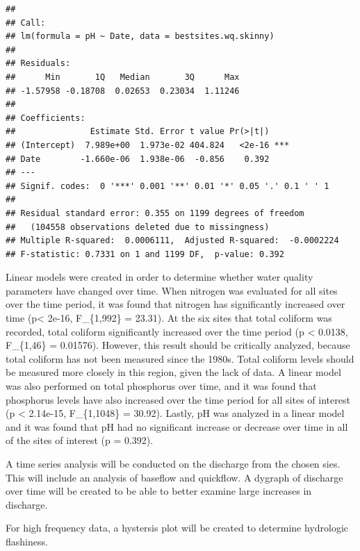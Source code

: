 \documentclass[12pt,]{article}
\begin{document}
\begin{verbatim}
## 
## Call:
## lm(formula = pH ~ Date, data = bestsites.wq.skinny)
## 
## Residuals:
##      Min       1Q   Median       3Q      Max 
## -1.57958 -0.18708  0.02653  0.23034  1.11246 
## 
## Coefficients:
##               Estimate Std. Error t value Pr(>|t|)    
## (Intercept)  7.989e+00  1.973e-02 404.824   <2e-16 ***
## Date        -1.660e-06  1.938e-06  -0.856    0.392    
## ---
## Signif. codes:  0 '***' 0.001 '**' 0.01 '*' 0.05 '.' 0.1 ' ' 1
## 
## Residual standard error: 0.355 on 1199 degrees of freedom
##   (104558 observations deleted due to missingness)
## Multiple R-squared:  0.0006111,  Adjusted R-squared:  -0.0002224 
## F-statistic: 0.7331 on 1 and 1199 DF,  p-value: 0.392
\end{verbatim}

Linear models were created in order to determine whether water quality
parameters have changed over time. When nitrogen was evaluated for all
sites over the time period, it was found that nitrogen has significantly
increased over time (p\textless{} 2e-16, F\_\{1,992\} = 23.31). At the
six sites that total coliform was recorded, total coliform significantly
increased over the time period (p \textless{} 0.0138, F\_\{1,46\} =
0.01576). However, this result should be critically analyzed, because
total coliform has not been measured since the 1980s. Total coliform
levels should be measured more closely in this region, given the lack of
data. A linear model was also performed on total phosphorus over time,
and it was found that phosphorus levels have also increased over the
time period for all sites of interest (p \textless{} 2.14e-15,
F\_\{1,1048\} = 30.92). Lastly, pH was analyzed in a linear model and it
was found that pH had no significant increase or decrease over time in
all of the sites of interest (p = 0.392).

A time series analysis will be conducted on the discharge from the
chosen sies. This will include an analysis of baseflow and quickflow. A
dygraph of discharge over time will be created to be able to better
examine large increases in discharge.

For high frequency data, a hystersis plot will be created to determine
hydrologic flashiness.

\newpage
\end{document}
